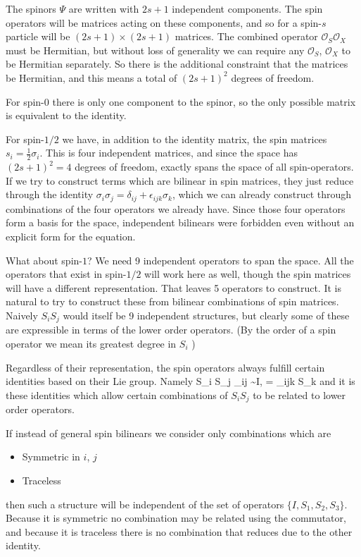 The spinors $\Psi$ are written with $2s+1$ independent components.  The spin operators will be matrices acting on these components, and so for a spin-$s$ particle will be $(2s+1) \times (2s+1)$ matrices.  The combined operator $\mathcal{O}_S \mathcal{O}_X$ must be Hermitian, but without loss of generality we can require any $\mathcal{O}_S$, $\mathcal{O}_X$ to be Hermitian separately.  So there is the additional constraint that the matrices be Hermitian, and this means a total of $(2s+1)^2$ degrees of freedom.


For spin-$0$ there is only one component to the spinor, so the only possible matrix is equivalent to the identity.

For spin-$1/2$ we have, in addition to the identity matrix, the spin matrices $s_i = \frac{1}{2} \sigma_i$.  This is four independent matrices, and since the space has $(2s+1)^2 = 4$ degrees of freedom, exactly spans the space of all spin-operators.  If we try to construct terms which are bilinear in spin matrices, they just reduce through the identity $\sigma_i \sigma_j = \delta_{ij} + \epsilon_{ijk}\sigma_k$, which we can already construct through combinations of the four operators we already have.  Since those four operators form a basis for the space, independent bilinears were forbidden even without an explicit form for the equation.


What about spin-$1$?  We need 9 independent operators to span the space.  All the operators that exist in spin-$1/2$ will work here as well, though the spin matrices will have a different representation.  That leaves 5 operators to construct.  It is natural to try to construct these from bilinear combinations of spin matrices.  Naively $S_i S_j$ would itself be 9 independent structures, but clearly some of these are expressible in terms of the lower order operators.  (By the order of a spin operator we mean its greatest degree in $S_i$ )  %

Regardless of their representation, the spin operators always fulfill certain identities based on their Lie group.  Namely
\beq
	S_i S_j \delta_{ij} \sim I, \; [S_i, S_j] = \epsilon_{ijk} S_k
\eeq
and it is these identities which allow certain combinations of $S_i S_j$ to be related to lower order operators.

If instead of general spin bilinears we consider only combinations which are
\begin{itemize}
  \item Symmetric in $i$, $j$ 
  \item Traceless
\end{itemize}
then such a structure will be independent of the set of operators $\{I, S_1, S_2, S_3\}$.  Because it is symmetric no combination may be related using the commutator, and because it is traceless there is no combination that reduces due to the other identity.  %

